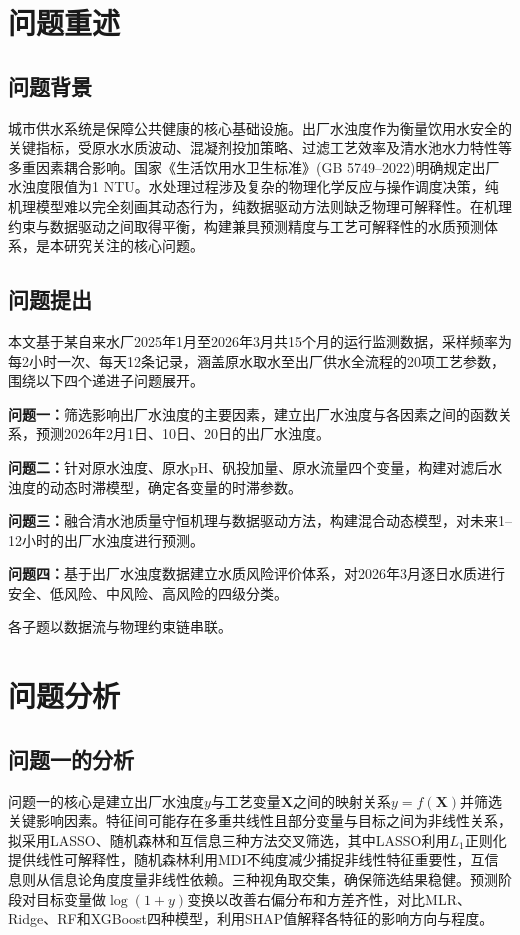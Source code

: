 \documentclass{cumcmthesis}
\begin{document}
\setcounter{page}{1}
\section{问题重述}

\subsection{问题背景}
城市供水系统是保障公共健康的核心基础设施。出厂水浊度作为衡量饮用水安全的关键指标，受原水水质波动、混凝剂投加策略、过滤工艺效率及清水池水力特性等多重因素耦合影响。国家《生活饮用水卫生标准》(GB 5749--2022)\cite{gb5749}明确规定出厂水浊度限值为1 NTU。水处理过程涉及复杂的物理化学反应与操作调度决策，纯机理模型难以完全刻画其动态行为，纯数据驱动方法则缺乏物理可解释性。在机理约束与数据驱动之间取得平衡，构建兼具预测精度与工艺可解释性的水质预测体系，是本研究关注的核心问题。

\subsection{问题提出}
本文基于某自来水厂2025年1月至2026年3月共15个月的运行监测数据，采样频率为每2小时一次、每天12条记录，涵盖原水取水至出厂供水全流程的20项工艺参数，围绕以下四个递进子问题展开。

\textbf{问题一：}筛选影响出厂水浊度的主要因素，建立出厂水浊度与各因素之间的函数关系，预测2026年2月1日、10日、20日的出厂水浊度。

\textbf{问题二：}针对原水浊度、原水pH、矾投加量、原水流量四个变量，构建对滤后水浊度的动态时滞模型，确定各变量的时滞参数。

\textbf{问题三：}融合清水池质量守恒机理与数据驱动方法，构建混合动态模型，对未来1--12小时的出厂水浊度进行预测。

\textbf{问题四：}基于出厂水浊度数据建立水质风险评价体系，对2026年3月逐日水质进行安全、低风险、中风险、高风险的四级分类。

各子题以数据流与物理约束链串联。

\section{问题分析}

\subsection{问题一的分析}
问题一的核心是建立出厂水浊度$y$与工艺变量$\mathbf{X}$之间的映射关系$y=f(\mathbf{X})$并筛选关键影响因素。特征间可能存在多重共线性且部分变量与目标之间为非线性关系，拟采用LASSO、随机森林和互信息三种方法交叉筛选，其中LASSO利用$L_1$正则化提供线性可解释性，随机森林利用MDI不纯度减少捕捉非线性特征重要性，互信息则从信息论角度度量非线性依赖。三种视角取交集，确保筛选结果稳健。预测阶段对目标变量做$\log(1+y)$变换以改善右偏分布和方差齐性，对比MLR、Ridge、RF和XGBoost四种模型，利用SHAP值解释各特征的影响方向与程度\cite{shap,claude}。
\end{document}
